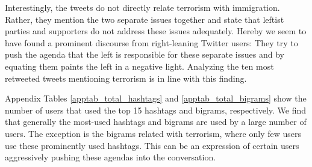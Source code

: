 \begin{figure}[H]
          
        \end{figure}
        
        Interestingly, the tweets do not directly relate terrorism with immigration. Rather, they mention the two separate issues together and state that leftist parties and supporters do not address these issues adequately. Hereby we seem to have found a prominent discourse from right-leaning Twitter users: They try to push the agenda that the left is responsible for these separate issues and by equating them paints the left in a negative light. Analyzing the ten most retweeted tweets mentioning terrorism is in line with this finding.
        
        Appendix Tables \ref{apptab_total_hashtags} and \ref{apptab_total_bigrams} show the number of users that used the top 15 hashtags and bigrams, respectively. We find that generally the most-used hashtags and bigrams are used by a large number of users. The exception is the bigrams related with terrorism, where only few users use these prominently used hashtags. This can be an expression of certain users aggressively pushing these agendas into the conversation.
        
        

